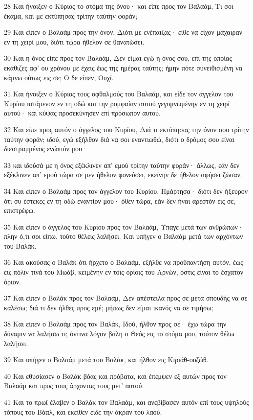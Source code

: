 \par 28 Και ήνοιξεν ο Κύριος το στόμα της όνου· και είπε προς τον Βαλαάμ, Τι σοι έκαμα, και με εκτύπησας τρίτην ταύτην φοράν;
\par 29 Και είπεν ο Βαλαάμ προς την όνον, Διότι με ενέπαιξας· είθε να είχον μάχαιραν εν τη χειρί μου, διότι τώρα ήθελον σε θανατώσει.
\par 30 Και η όνος είπε προς τον Βαλαάμ, Δεν είμαι εγώ η όνος σου, επί της οποίας εκάθιζες αφ' ου χρόνου με έχεις έως της ημέρας ταύτης; ήμην πότε συνειθισμένη να κάμνω ούτως εις σε; Ο δε είπεν, Ουχί.
\par 31 Και ήνοιξεν ο Κύριος τους οφθαλμούς του Βαλαάμ, και είδε τον άγγελον του Κυρίου ιστάμενον εν τη οδώ και την ρομφαίαν αυτού γεγυμνωμένην εν τη χειρί αυτού· και κύψας προσεκύνησεν επί πρόσωπον αυτού.
\par 32 Και είπε προς αυτόν ο άγγελος του Κυρίου, Διά τι εκτύπησας την όνον σου τρίτην ταύτην φοράν; ιδού, εγώ εξήλθον διά να σοι εναντιωθώ, διότι ο δρόμος σου είναι διεστραμμένος ενώπιόν μου·
\par 33 και ιδούσά με η όνος εξέκλινεν απ' εμού τρίτην ταύτην φοράν· άλλως, εάν δεν εξέκλινεν απ' εμού τώρα σε μεν ήθελον φονεύσει, εκείνην δε ήθελον αφήσει ζώσαν.
\par 34 Και είπεν ο Βαλαάμ προς τον άγγελον του Κυρίου, Ημάρτησα· διότι δεν ήξευρον ότι συ έστεκες εν τη οδώ εναντίον μου· όθεν τώρα, εάν δεν ήναι αρεστόν εις σε, επιστρέφω.
\par 35 Και είπεν ο άγγελος του Κυρίου προς τον Βαλαάμ, Ύπαγε μετά των ανθρώπων· πλην ό,τι σοι είπω, τούτο θέλεις λαλήσει. Και υπήγεν ο Βαλαάμ μετά των αρχόντων του Βαλάκ.
\par 36 Και ακούσας ο Βαλάκ ότι ήρχετο ο Βαλαάμ, εξήλθε να προϋπαντήση αυτόν, έως εις πόλιν τινά του Μωάβ, κειμένην εν τοις ορίοις του Αρνών, όστις είναι το έσχατον όριον.
\par 37 Και είπεν ο Βαλάκ προς τον Βαλαάμ, Δεν απέστειλα προς σε μετά σπουδής να σε καλέσω; διά τι δεν ήλθες προς εμέ; μήπως δεν είμαι ικανός να σε τιμήσω;
\par 38 Και είπεν ο Βαλαάμ προς τον Βαλάκ, Ιδού, ήλθον προς σέ· έχω τώρα την δύναμιν να λαλήσω τι; όντινα λόγον βάλη ο Θεός εις το στόμα μου, τούτον θέλω λαλήσει.
\par 39 Και υπήγεν ο Βαλαάμ μετά του Βαλάκ, και ήλθον εις Κιριάθ-ουζώθ.
\par 40 Και εθυσίασεν ο Βαλάκ βόας και πρόβατα, και έπεμψεν εξ αυτών προς τον Βαλαάμ και προς τους άρχοντας τους μετ' αυτού.
\par 41 Και το πρωΐ έλαβεν ο Βαλάκ τον Βαλαάμ, και ανεβίβασεν αυτόν επί τους υψηλούς τόπους του Βάαλ, και εκείθεν είδε την άκραν του λαού.

